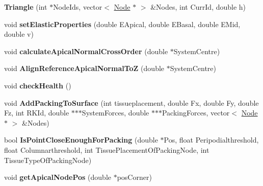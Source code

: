 \begin{DoxyCompactItemize}
\item 
\hypertarget{classTriangle_a1ea2d067d286e87f1de2eb2fbde7c5e2}{}{\bfseries Triangle} (int $\ast$Node\+Ids, vector$<$ \hyperlink{classNode}{Node} $\ast$ $>$ \&Nodes, int Curr\+Id, double h)\label{classTriangle_a1ea2d067d286e87f1de2eb2fbde7c5e2}

\item 
\hypertarget{classTriangle_a9a0174324eb44506b6628452200d37ef}{}void {\bfseries set\+Elastic\+Properties} (double E\+Apical, double E\+Basal, double E\+Mid, double v)\label{classTriangle_a9a0174324eb44506b6628452200d37ef}

\item 
\hypertarget{classTriangle_adc0585ae36d0068e6cd3d74b5d290811}{}void {\bfseries calculate\+Apical\+Normal\+Cross\+Order} (double $\ast$System\+Centre)\label{classTriangle_adc0585ae36d0068e6cd3d74b5d290811}

\item 
\hypertarget{classTriangle_a3fde5757c488c9226583c71bf3cb43d3}{}void {\bfseries Align\+Reference\+Apical\+Normal\+To\+Z} (double $\ast$System\+Centre)\label{classTriangle_a3fde5757c488c9226583c71bf3cb43d3}

\item 
\hypertarget{classTriangle_ae2d34573720ad9b04c8fbaafb658b8af}{}void {\bfseries check\+Health} ()\label{classTriangle_ae2d34573720ad9b04c8fbaafb658b8af}

\item 
\hypertarget{classTriangle_a9e8b1fa244db29a80f93c59267b062da}{}void {\bfseries Add\+Packing\+To\+Surface} (int tissueplacement, double Fx, double Fy, double Fz, int R\+K\+Id, double $\ast$$\ast$$\ast$System\+Forces, double $\ast$$\ast$$\ast$Packing\+Forces, vector$<$ \hyperlink{classNode}{Node} $\ast$ $>$ \&Nodes)\label{classTriangle_a9e8b1fa244db29a80f93c59267b062da}

\item 
\hypertarget{classTriangle_a054ffe6fc83a96baee97b261c651ea33}{}bool {\bfseries Is\+Point\+Close\+Enough\+For\+Packing} (double $\ast$Pos, float Peripodialthreshold, float Columnarthreshold, int Tissue\+Placement\+Of\+Packing\+Node, int Tissue\+Type\+Of\+Packing\+Node)\label{classTriangle_a054ffe6fc83a96baee97b261c651ea33}

\item 
\hypertarget{classTriangle_ab1a4c194be5a3ab7a93db682e9c992fe}{}void {\bfseries get\+Apical\+Node\+Pos} (double $\ast$pos\+Corner)\label{classTriangle_ab1a4c194be5a3ab7a93db682e9c992fe}


\end{DoxyCompactItemize}
